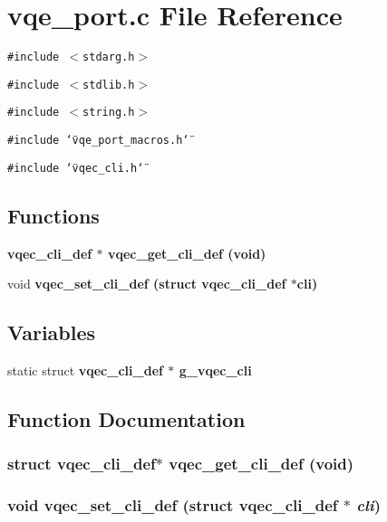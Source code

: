 \section{vqe\_\-port.c File Reference}
\label{vqe__port_8c}
{\tt \#include $<$stdarg.h$>$}\par
{\tt \#include $<$stdlib.h$>$}\par
{\tt \#include $<$string.h$>$}\par
{\tt \#include \char`\"{}vqe\_\-port\_\-macros.h\char`\"{}}\par
{\tt \#include \char`\"{}vqec\_\-cli.h\char`\"{}}\par
\subsection*{Functions}
\begin{CompactItemize}
\item 
\bf{vqec\_\-cli\_\-def} $\ast$ \bf{vqec\_\-get\_\-cli\_\-def} (void)
\item 
void \bf{vqec\_\-set\_\-cli\_\-def} (struct \bf{vqec\_\-cli\_\-def} $\ast$cli)
\end{CompactItemize}
\subsection*{Variables}
\begin{CompactItemize}
\item 
static struct \bf{vqec\_\-cli\_\-def} $\ast$ \bf{g\_\-vqec\_\-cli}
\end{CompactItemize}


\subsection{Function Documentation}
\subsubsection{\setlength{\rightskip}{0pt plus 5cm}struct \bf{vqec\_\-cli\_\-def}$\ast$ vqec\_\-get\_\-cli\_\-def (void)}\label{vqe__port_8c_1f51a21852bb6f0bc37ee5c855de5e40}


\subsubsection{\setlength{\rightskip}{0pt plus 5cm}void vqec\_\-set\_\-cli\_\-def (struct \bf{vqec\_\-cli\_\-def} $\ast$ {\em cli})}\label{vqe__port_8c_3c679b5ae015bf4df2d459d7661106d7}




